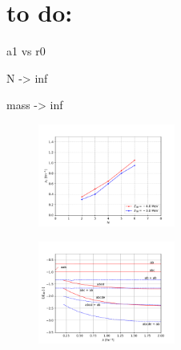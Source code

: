\documentclass[aps,nofootinbib,prl,showpacs,twocolumn,groupedaddress,superscriptaddress]
{revtex4}
\begin{document}
\section{to do:}
a1 vs r0

N -> inf

mass -> inf

\begin{figure}[htb] 
\begin{center} 
\includegraphics[width=0.4\textwidth]{Graf/Lc-vs-N.pdf}
\caption{}
\label{fig:fig1}
\end{center} 
\end{figure}

\begin{figure}[htb] 
\begin{center} 
\includegraphics[width=0.4\textwidth]{Graf/E3b15-thresholds.pdf}
\caption{}
\label{fig:fig2}
\end{center} 
\end{figure}

\newpage
\end{document}

